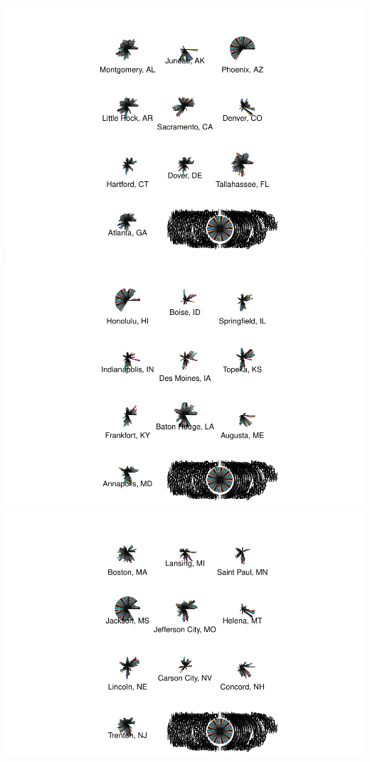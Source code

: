 \documentclass[
]{article}
\begin{document}
\includegraphics{graphics/chunk-distances-kmeans-setup-temp-2.pdf}
\includegraphics{graphics/chunk-distances-kmeans-setup-temp-3.pdf}
\includegraphics{graphics/chunk-distances-kmeans-setup-temp-4.pdf}
\end{document}
